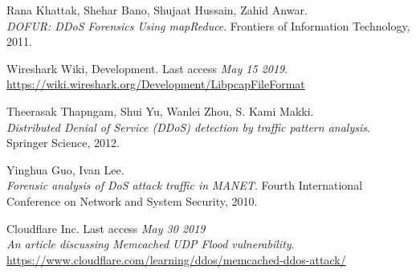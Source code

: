 \newpage
\begin{thebibliography}{9}
Rana Khattak, Shehar Bano, Shujaat Hussain, Zahid Anwar. 
\\\textit{DOFUR: DDoS Forensics Using mapReduce}. Frontiers of Information Technology, 2011.

Wireshark Wiki, Development. Last access \textit{May 15 2019}.
\\\url{https://wiki.wireshark.org/Development/LibpcapFileFormat}

Theerasak Thapngam, Shui Yu, Wanlei Zhou, S. Kami Makki.
\\\textit{Distributed Denial of Service (DDoS) detection by traffic pattern analysis}.
Springer Science, 2012.

Yinghua Guo, Ivan Lee.
\\\textit{Forensic analysis of DoS attack traffic in MANET}. 
Fourth International Conference on Network and System Security, 2010.

Cloudflare Inc. Last access \textit{May 30 2019}
\\\textit{An article discussing Memcached UDP Flood vulnerability}. 
\\\url{https://www.cloudflare.com/learning/ddos/memcached-ddos-attack/}

\end{thebibliography}